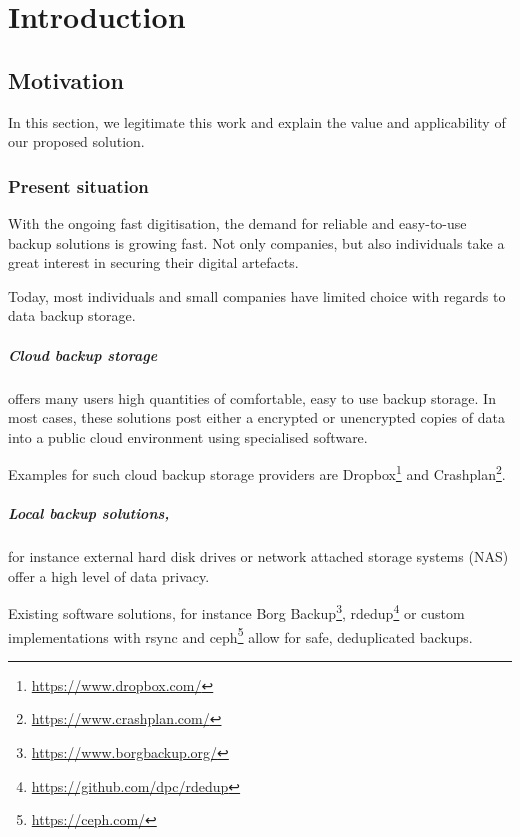 \chapter{Introduction}
\label{sec:introduction}

\section{Motivation}
In this section, we legitimate this work and explain the value and applicability of our proposed solution.

\subsection{Present situation}
With the ongoing fast digitisation, the demand for reliable and easy-to-use backup solutions is growing fast. Not only companies, but also individuals take a great interest in securing their digital artefacts.

Today, most individuals and small companies have limited choice with regards to data backup storage.

\paragraph{Cloud backup storage} offers many users high quantities of comfortable, easy to use backup storage. In most cases, these solutions post either a encrypted or unencrypted copies of data into a public cloud environment using specialised software.

Examples for such cloud backup storage providers are Dropbox\footnote{\url{https://www.dropbox.com/}} and Crashplan\footnote{\url{https://www.crashplan.com/}}.

\paragraph{Local backup solutions,} for instance external hard disk drives or network attached storage systems (NAS) offer a high level of data privacy. 

Existing software solutions, for instance Borg Backup\footnote{\url{https://www.borgbackup.org/}}, rdedup\footnote{\url{https://github.com/dpc/rdedup}} or custom implementations with rsync and ceph\footnote{\url{https://ceph.com/}} allow for safe, deduplicated backups.

